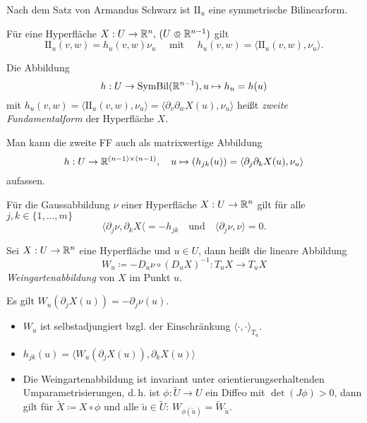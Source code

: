 \documentclass{cheat-sheet}
\newcommand{\SymBil}{\mathrm{SymBil}}
\newcommand{\II}{\mathrm{I\!I}}
\newcommand\opn{\mathrel{\ooalign{$\subset$\cr
  \hidewidth\raise.1ex\hbox{$\circ\mkern.5mu$}\cr}}}
\begin{document}
\begin{bem}
  Nach dem Satz von Armandus Schwarz ist $\II_u$ eine symmetrische Bilinearform.
\end{bem}

\begin{bem}
  Für eine Hyperfläche $X : U \to \R^n, \, (U \opn \R^{n-1})$ gilt
  \[ \II_u(v, w) = h_u(v, w) \nu_u \quad \text{ mit } \quad h_u(v, w) = \langle \II_u(v, w) , \nu_u \rangle. \]
\end{bem}

\begin{defn}
  Die Abbildung
  \[ h : U \to \SymBil(\R^{n-1}), u \mapsto h_u = h(u) \]
  mit $h_u(v, w) = \langle \II_u(v, w), \nu_u \rangle = \langle \partial_v \partial_w X(u), \nu_u \rangle$ heißt \emph{zweite Fundamentalform} der Hyperfläche $X$.
\end{defn}

\begin{bem}
  Man kann die zweite FF auch als matrixwertige Abbildung
  \[ h : U \to \mathbb{R}^{(n-1) \times (n-1)}, \quad u \mapsto (h_{jk}(u)) = \langle \partial_j \partial_k X(u), \nu_u \rangle \]
  aufassen.
\end{bem}

\begin{satz}
  Für die Gaussabbildung $\nu$ einer Hyperfläche $X : U \to \mathbb{R}^n$ gilt für alle $j, k \in \{ 1, ..., m \}$
  \[ \langle \partial_j \nu , \partial_k X \langle = - h_{jk} \quad \text{und} \quad \langle \partial_j \nu, \nu \rangle = 0. \]
\end{satz}

\begin{defn}
  Sei $X : U \to \mathbb{R}^n$ eine Hyperfläche und $u \in U$, dann heißt die lineare Abbildung
  \[ W_u \coloneqq - D_u \nu \circ (D_u X)^{-1} : T_u X \to T_u X \]
  \emph{Weingartenabbildung} von $X$ im Punkt $u$.
\end{defn}

\begin{bem}
  Es gilt $W_u(\partial_j X(u)) = - \partial_j \nu(u)$.
\end{bem}

\begin{satz}
  \begin{itemize}
    \item $W_u$ ist selbstadjungiert bzgl. der Einschränkung $\langle \cdot , \cdot \rangle_{T_u}$.
    \item $h_{jk}(u) = \langle W_u(\partial_j X(u)), \partial_k X(u) \rangle$
    \item Die Weingartenabbildung ist invariant unter orientierungserhaltenden Umparametrisierungen, d.\,h. ist $\phi : \tilde{U} \to U$ ein Diffeo mit $\det(J\phi) > 0$, dann gilt für $\tilde{X} \coloneqq X \circ \phi$ und alle $\tilde{u} \in \tilde{U}$: $W_{\phi(\tilde{u})} = \tilde{W}_{\tilde{u}}$.
  \end{itemize}
\end{satz}
\end{document}
